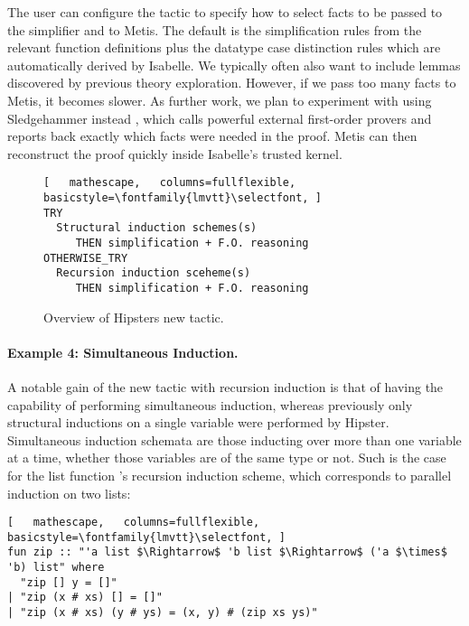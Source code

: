 The user can configure the tactic to specify how to select facts to be passed to the simplifier and to Metis.
%
The default is the simplification rules from the relevant function definitions plus the datatype case distinction rules which are automatically derived by Isabelle.
%
We typically often also want to include lemmas discovered by previous theory exploration.
%
However, if we pass too many facts to Metis, it becomes slower.
%
As further work, we plan to experiment with using Sledgehammer instead \cite{sledgehammer}, which calls powerful external first-order provers and reports back exactly which facts were needed in the proof.
%
Metis can then reconstruct the proof quickly inside Isabelle's trusted kernel.

\begin{figure}
\begin{lstlisting}[   mathescape,   columns=fullflexible,   basicstyle=\fontfamily{lmvtt}\selectfont, ]
TRY
  Structural induction schemes(s)
     THEN simplification + F.O. reasoning
OTHERWISE_TRY
  Recursion induction sceheme(s)
     THEN simplification + F.O. reasoning
\end{lstlisting}		
\caption{Overview of Hipsters new tactic.}	
\label{fig:tactic}
\end{figure}


\paragraph*{Example 4: Simultaneous Induction.}
%

A notable gain of the new tactic with recursion induction is that of having the capability of performing simultaneous induction, whereas previously only structural inductions on a single variable were performed by Hipster.
%
Simultaneous induction schemata are those inducting over more than one variable at a time, whether those variables are of the same type or not.
%
Such is the case for the list function 's recursion induction scheme, which corresponds to parallel induction on two lists:

\begin{lstlisting}[   mathescape,   columns=fullflexible,   basicstyle=\fontfamily{lmvtt}\selectfont, ]
fun zip :: "'a list $\Rightarrow$ 'b list $\Rightarrow$ ('a $\times$ 'b) list" where
  "zip [] y = []"
| "zip (x # xs) [] = []"
| "zip (x # xs) (y # ys) = (x, y) # (zip xs ys)"
\end{lstlisting}


